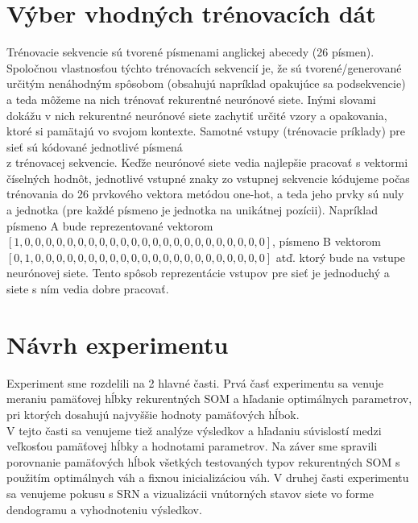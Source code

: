 \section{Výber vhodných trénovacích dát}
Trénovacie sekvencie sú tvorené písmenami anglickej abecedy (26 písmen).
Spoločnou vlastnosťou týchto trénovacích sekvencií je, že sú tvorené/generované určitým nenáhodným spôsobom (obsahujú napríklad opakujúce sa podsekvencie)
a teda môžeme na nich trénovať rekurentné neurónové siete. 
Inými slovami dokážu v nich rekurentné neurónové siete zachytiť určité vzory a opakovania, ktoré si pamätajú vo svojom kontexte.
Samotné vstupy (trénovacie príklady) pre sieť sú kódované jednotlivé písmená \\ z trénovacej sekvencie.
Keďže neurónové siete vedia najlepšie pracovať s vektormi číselných hodnôt, jednotlivé vstupné znaky zo 
vstupnej sekvencie kódujeme počas trénovania do 26 prvkového vektora metódou one-hot, 
a teda jeho prvky sú nuly a jednotka (pre každé písmeno je jednotka na unikátnej pozícii).
Napríklad písmeno A bude reprezentované vektorom
$[1, 0, 0, 0, 0, 0, 0, 0, 0, 0, 0, 0, 0, 0, 0, 0, 0, 0, 0, 0, 0, 0, 0, 0]$,
písmeno B vektorom $[0, 1, 0, 0, 0, 0, 0, 0, 0, 0, 0, 0, 0, 0, 0, 0, 0, 0, 0, 0, 0, 0, 0, 0]$ atď. 
ktorý bude na vstupe neurónovej siete.
Tento spôsob reprezentácie vstupov pre sieť je jednoduchý a siete s ním vedia dobre pracovať.


\section {Návrh experimentu}
Experiment sme rozdelili na 2 hlavné časti. 
Prvá časť experimentu sa venuje meraniu pamäťovej hĺbky rekurentných SOM a hľadanie 
optimálnych parametrov, pri ktorých dosahujú najvyššie hodnoty pamäťových hĺbok. \\
V tejto časti sa venujeme tiež analýze výsledkov a hľadaniu súvislostí medzi veľkosťou pamäťovej hĺbky 
a hodnotami parametrov. 
Na záver sme spravili porovnanie pamäťových hĺbok všetkých testovaných typov rekurentných SOM s 
použitím optimálnych váh a fixnou inicializáciou váh.
V druhej časti experimentu sa venujeme pokusu s SRN a vizualizácii vnútorných stavov siete vo forme 
dendogramu a vyhodnoteniu výsledkov.

